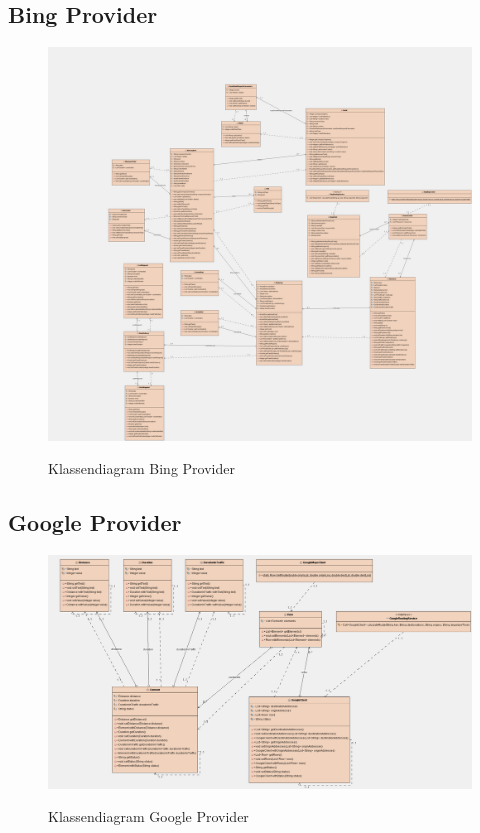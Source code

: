 \documentclass[a4paper]{article}
\begin{document}
\subsection{Bing Provider}

\begin{figure}[H]
\centering
\includegraphics[width=\textwidth]{Images/ktestproviderbingr.png}\\
\caption{Klassendiagram Bing Provider}
\end{figure}

\subsection{Google Provider}

\begin{figure}[H]
\centering
\includegraphics[width=\textwidth]{Images/ktestprovidergoogler.png}\\
\caption{Klassendiagram Google Provider}
\end{figure}
\end{document}

